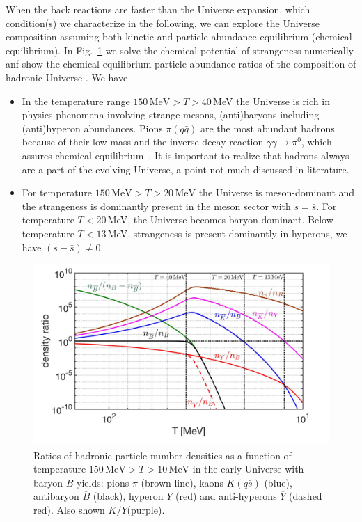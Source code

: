 \documentclass[universe,article,submit,moreauthors,pdftex,a4paper]{Definitions/mdpi}
\begin{document}
When the back reactions are faster than the Universe expansion, which condition(s) we characterize in the following, we can explore the Universe composition assuming both kinetic and particle abundance equilibrium (chemical equilibrium). In Fig.~\ref{EquilibPartRatiosFig} we solve the chemical potential of strangeness numerically anf show the chemical equilibrium particle abundance ratios of the composition of hadronic Universe \cite{Yang:2021bko}. We have
\begin{itemize}
\item
In the temperature range $150\,\mathrm{MeV} >T >40$\,MeV the Universe is rich in physics phenomena involving strange mesons, (anti)baryons including (anti)hyperon abundances. Pions $\pi(q\bar q)$ are the most abundant hadrons because of their low mass and the inverse decay reaction $\gamma\gamma\rightarrow\pi^0$, which assures chemical equilibrium~\cite{Kuznetsova:2008jt}. It is important to realize that hadrons always are a part of the evolving Universe, a point not much discussed in literature.

\item
For temperature $150\,\mathrm{MeV}>T>20\,\mathrm{MeV}$ the Universe is meson-dominant and the strangeness is dominantly present in the meson sector with $s=\bar s$. For temperature $T<20$\,MeV, the Universe becomes baryon-dominant. Below temperature $T<13$\,MeV, strangeness is present dominantly in hyperons, we have $(s -\bar s)\ne 0$.
\end{itemize}
\begin{figure}[bt]
\centering
\includegraphics[width=\linewidth]{Meson_Baryon_density_ratio_CTYang.jpg}
\caption{Ratios of hadronic particle number densities as a function of temperature $150\,\mathrm{MeV}> T>10\,\mathrm{MeV}$ in the early Universe with baryon $B$ yields: pions $\pi$ (brown line), kaons $K( q\bar s)$ (blue), antibaryon $\overline B$ (black), hyperon $Y$ (red) and anti-hyperons $\overline Y$ (dashed red). Also shown $\overline K/Y$(purple).}
\label{EquilibPartRatiosFig}
\end{figure}
\end{document}
